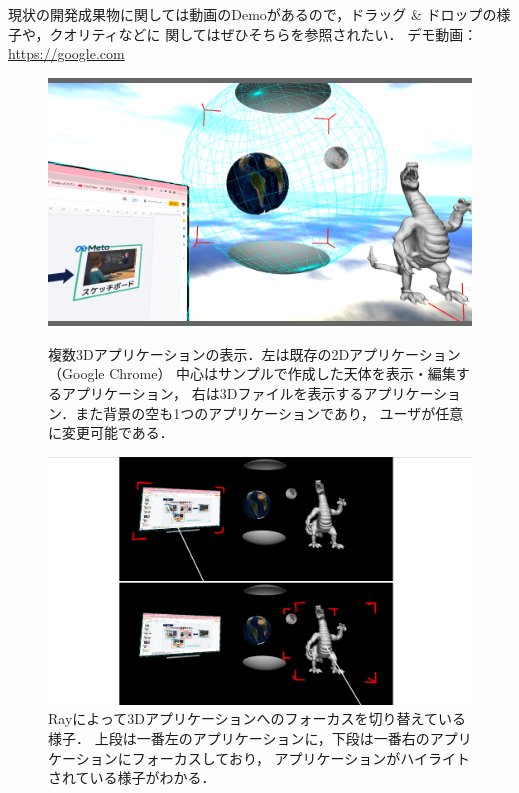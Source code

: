 現状の開発成果物に関しては動画のDemoがあるので，ドラッグ \& ドロップの様子や，クオリティなどに
関してはぜひそちらを参照されたい．
デモ動画：\url{https://google.com}

\begin{figure}[htbp]
  \begin{minipage}[t]{0.50\linewidth}
    \centering
    \includegraphics[keepaspectratio, width=\linewidth]{fig/multi-app.png}
    \caption{
      複数3Dアプリケーションの表示．左は既存の2Dアプリケーション（Google Chrome）
      中心はサンプルで作成した天体を表示・編集するアプリケーション，
      右は3Dファイルを表示するアプリケーション．また背景の空も1つのアプリケーションであり，
      ユーザが任意に変更可能である．
    }
    \label{fig:multi-app}
  \end{minipage}
  \begin{minipage}[t]{0.50\linewidth}
    \centering
    \includegraphics[keepaspectratio, width=\linewidth]{fig/ray-input.png}
    \caption{
      Rayによって3Dアプリケーションへのフォーカスを切り替えている様子．
      上段は一番左のアプリケーションに，下段は一番右のアプリケーションにフォーカスしており，
      アプリケーションがハイライトされている様子がわかる．
    }
    \label{fig:ray-input}
  \end{minipage}
\end{figure}

